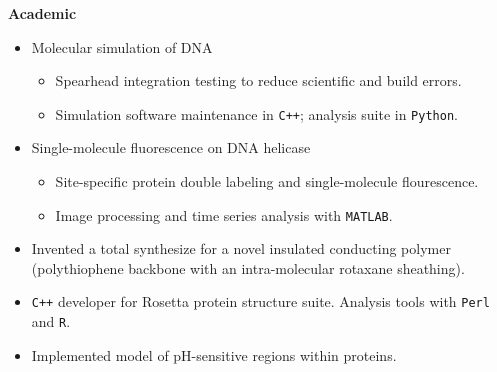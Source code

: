 \documentclass[margin]{res}
\begin{document}
\begin{sloppypar}
\begin{resume}
\textbf{Academic} \\
\begin{itemize}
\item Molecular simulation of DNA
    \begin{itemize}
        \item Spearhead integration testing to reduce scientific and build errors.
        \item Simulation software maintenance in \texttt{C++}; analysis suite in \texttt{Python}.
    \end{itemize}
\item Single-molecule fluorescence on DNA helicase
    \begin{itemize}
    \item Site-specific protein double labeling and single-molecule flourescence.
    \item Image processing and time series analysis with \textsc{\texttt{MATLAB}}. 
    \end{itemize}
\end{itemize}

\begin{itemize}
\item Invented a total synthesize for a novel insulated conducting polymer (polythiophene backbone with an intra-molecular rotaxane sheathing).
\end{itemize}

\begin{itemize}
\item \texttt{C++} developer for Rosetta protein structure suite. Analysis tools with \texttt{Perl} and \texttt{R}.
\item Implemented model of pH-sensitive regions within proteins.
\end{itemize}


\end{resume}
\end{sloppypar}
\end{document}
